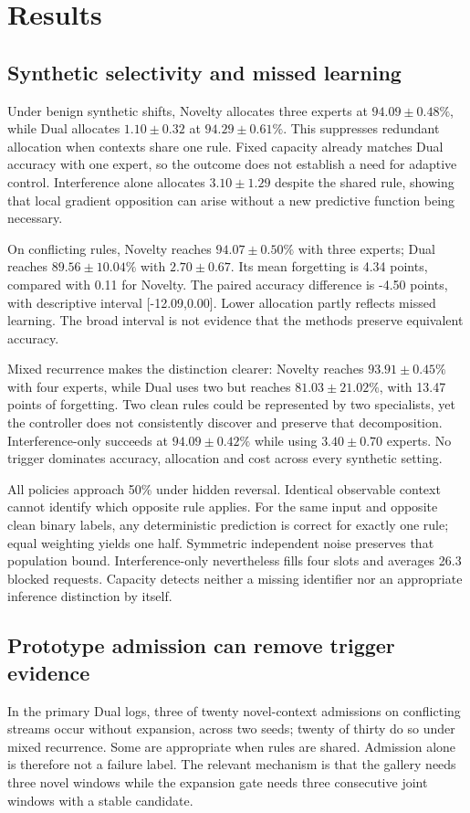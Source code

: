 \section{Results}

\subsection{Synthetic selectivity and missed learning}
Under benign synthetic shifts, Novelty allocates three experts at \(94.09\pm0.48\%\), while Dual allocates \(1.10\pm0.32\) at \(94.29\pm0.61\%\). This suppresses redundant allocation when contexts share one rule. Fixed capacity already matches Dual accuracy with one expert, so the outcome does not establish a need for adaptive control. Interference alone allocates \(3.10\pm1.29\) despite the shared rule, showing that local gradient opposition can arise without a new predictive function being necessary.

On conflicting rules, Novelty reaches \(94.07\pm0.50\%\) with three experts; Dual reaches \(89.56\pm10.04\%\) with \(2.70\pm0.67\). Its mean forgetting is 4.34 points, compared with 0.11 for Novelty. The paired accuracy difference is -4.50 points, with descriptive interval [-12.09,0.00]. Lower allocation partly reflects missed learning. The broad interval is not evidence that the methods preserve equivalent accuracy.

Mixed recurrence makes the distinction clearer: Novelty reaches \(93.91\pm0.45\%\) with four experts, while Dual uses two but reaches \(81.03\pm21.02\%\), with 13.47 points of forgetting. Two clean rules could be represented by two specialists, yet the controller does not consistently discover and preserve that decomposition. Interference-only succeeds at \(94.09\pm0.42\%\) while using \(3.40\pm0.70\) experts. No trigger dominates accuracy, allocation and cost across every synthetic setting.

All policies approach 50\% under hidden reversal. Identical observable context cannot identify which opposite rule applies. For the same input and opposite clean binary labels, any deterministic prediction is correct for exactly one rule; equal weighting yields one half. Symmetric independent noise preserves that population bound. Interference-only nevertheless fills four slots and averages 26.3 blocked requests. Capacity detects neither a missing identifier nor an appropriate inference distinction by itself.

\subsection{Prototype admission can remove trigger evidence}
In the primary Dual logs, three of twenty novel-context admissions on conflicting streams occur without expansion, across two seeds; twenty of thirty do so under mixed recurrence. Some are appropriate when rules are shared. Admission alone is therefore not a failure label. The relevant mechanism is that the gallery needs three novel windows while the expansion gate needs three consecutive joint windows with a stable candidate.

